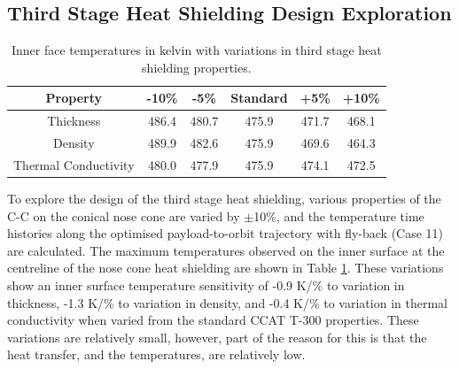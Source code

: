 \subsection{Third Stage Heat Shielding Design Exploration}\label{sec:thirdstageheat}
\begin{table}[!ht]
	\centering
	\begin{tabular}{|c|c|c|c|c|c|}
		\hline Property & -10\% & -5\% & Standard & +5\% & +10\% \\ 
		\hline Thickness & 486.4 & 480.7 & 475.9 &  471.7 & 468.1  \\ 
		\hline Density &  489.9 & 482.6 & 475.9 & 469.6 &  464.3\\ 
		\hline Thermal Conductivity & 480.0 & 477.9 & 475.9 & 474.1 & 472.5 \\ 
		\hline 
	\end{tabular} 
	
	\caption{Inner face temperatures in kelvin with variations in third stage heat shielding properties.}
	\label{tab:tpsthirdstage}
\end{table}
\noindent
To explore the design of the third stage heat shielding, various properties of the C-C on the conical nose cone are varied by $\pm$10\%, and the temperature time histories along the optimised payload-to-orbit trajectory with fly-back (Case 11) are calculated. The maximum temperatures observed on the inner surface at the centreline of the nose cone heat shielding are shown in Table \ref{tab:tpsthirdstage}. These variations show an inner surface temperature sensitivity of -0.9 K/\% to variation in thickness, -1.3 K/\% to variation in density, and -0.4 K/\% to variation in thermal conductivity when varied from the standard CCAT T-300 properties. These variations are relatively small, however, part of the reason for this is that the heat transfer, and the temperatures, are relatively low. 






